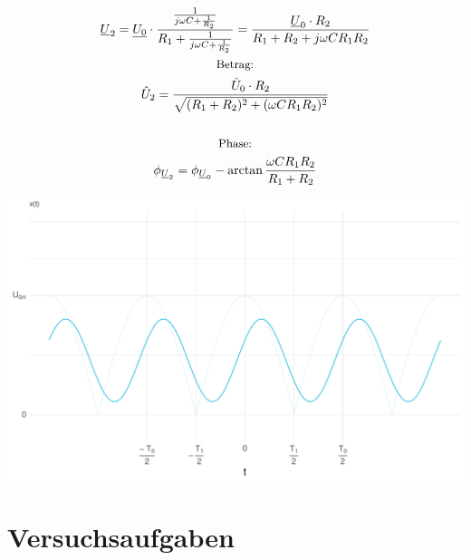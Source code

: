 \documentclass[a4paper, 12pt]{article}
\begin{document}
    \begin{gather*}
      \underline{U}_2 = \underline{U_0} \cdot \dfrac{ \frac{1}{ j \omega C + \frac{1}{R_2} }  }{ R_1 + \frac{1}{ j \omega C + \frac{1}{R_2} } } = \frac{\underline{U}_0 \cdot R_2}{R_1+R_2+ j \omega C R_1 R_2}\\
      \text{\small Betrag:}\\
      \hat{U}_2 = \frac{\hat{U}_0 \cdot R_2}{\sqrt{(R_1+R_2)^2 + (\omega C R_1 R_2)^2}}\\\\
      \text{\small Phase:}\\
      \phi_{\underline{U}_2} = \phi_{\underline{U}_0} - \arctan{ \frac{\omega C R_1 R_2}{R_1+R_2} }
    \end{gather*}

    \begin{center}
      \includegraphics[scale=0.5]{./R/2_3/2_3_function.pdf}
    \end{center}

\pagebreak
\section{Versuchsaufgaben}
\end{document}

